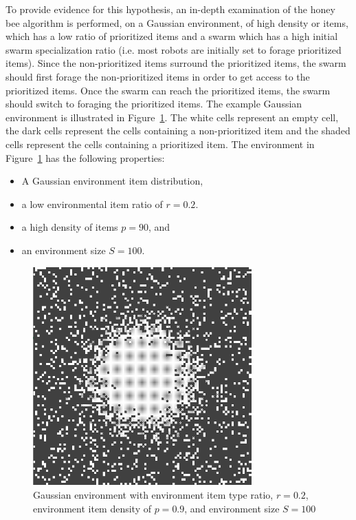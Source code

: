 To provide evidence for this hypothesis, an in-depth examination of the honey bee algorithm is performed, on a Gaussian environment, of high density or items, which has a low ratio of prioritized items and a swarm which has a high initial swarm specialization ratio (i.e. most robots are initially set to forage prioritized items). Since the non-prioritized items surround the prioritized items, the swarm should first forage the non-prioritized items in order to get access to the prioritized items. Once the swarm can reach the prioritized items, the swarm should switch to foraging the prioritized items. The example Gaussian environment is illustrated in Figure~\ref{fig:gaussianhighdensityenv}. The white cells represent an empty cell, the dark cells represent the cells containing a non-prioritized item and the shaded cells represent the cells containing a prioritized item. The environment in Figure~\ref{fig:gaussianhighdensityenv} has the following properties:

\begin{itemize}
\item A Gaussian environment item distribution,
\item a low environmental item ratio of $r=0.2$.
\item a high density of items $p=90$, and
\item an environment size $S=100$.
\end{itemize}

\begin{figure}[!htb]
\centering
\includegraphics[width=0.75\textwidth]{chapters/chapter6/figures/flexibility-gaussian-obj90-ratio.PNG}
\caption{Gaussian environment with environment item type ratio, $r=0.2$, environment item density of $p=0.9$, and environment size $S=100$}
\label{fig:gaussianhighdensityenv}
\end{figure}

